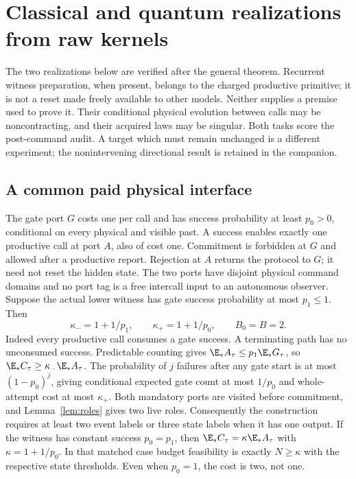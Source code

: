 \section{Classical and quantum realizations from raw kernels}\label{sec:realizations}
The two realizations below are verified after the general theorem. Recurrent witness preparation, when present, belongs to the charged productive primitive; it is not a reset made freely available to other models. Neither supplies a premise used to prove it. Their conditional physical evolution between calls may be noncontracting, and their acquired laws may be singular. Both tasks score the post-command audit. A target which must remain unchanged is a different experiment; the nonintervening directional result is retained in the companion.

\subsection*{A common paid physical interface}
The gate port $G$ costs one per call and has success probability at least $p_0>0$, conditional on every physical and visible past. A success enables exactly one productive call at port $A$, also of cost one. Commitment is forbidden at $G$ and allowed after a productive report. Rejection at $A$ returns the protocol to $G$; it need not reset the hidden state. The two ports have disjoint physical command domains and no port tag is a free intercall input to an autonomous observer. Suppose the actual lower witness has gate success probability at most $p_1\le1$. Then
\begin{equation}\label{eq:gate-constants}
 \kappa_-=1+1/p_1,\qquad \kappa_+=1+1/p_0,
 \qquad B_0=B=2.
\end{equation}
Indeed every productive call consumes a gate success. A terminating path has no unconsumed success. Predictable counting gives $\E_*A_\tau\le p_1\E_*G_\tau$, so $\E_*C_\tau\ge\kappa_-\E_*A_\tau$. The probability of $j$ failures after any gate start is at most $(1-p_0)^j$, giving conditional expected gate count at most $1/p_0$ and whole-attempt cost at most $\kappa_+$. Both mandatory ports are visited before commitment, and Lemma~\ref{lem:roles} gives two live roles. Consequently the construction requires at least two event labels or three state labels when it has one output. If the witness has constant success $p_0=p_1$, then $\E_*C_\tau=\kappa\E_*A_\tau$ with $\kappa=1+1/p_0$. In that matched case budget feasibility is exactly $N\ge\kappa$ with the respective state thresholds. Even when $p_0=1$, the cost is two, not one.


